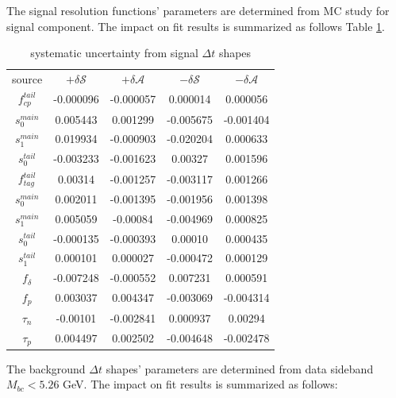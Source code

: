 The signal resolution functions' parameters are determined from MC study for signal component. The impact on fit results is summarized as follows Table \ref{tab:sy_res}.
\begin{table}[H]
	\begin{minipage}[b]{1.0\linewidth}
		\centering
		\caption{systematic uncertainty from signal $\Delta t$ shapes}
		\label{tab:sy_res}
		\begin{tabular}{c c c c c}
			\hline
			source & $+\delta \mathcal{S}$ & $+\delta \mathcal{A}$ & $-\delta \mathcal{S}$ &  $-\delta \mathcal{A}$\\
			$f_{cp}^{tail}$ & -0.000096 & -0.000057
			& 0.000014
			& 0.000056
			\\
			$s_0^{main}$& 0.005443
			& 0.001299
			& -0.005675
			& -0.001404
			\\
			$s_1^{main}$ & 0.019934
			& -0.000903
			& -0.020204
			& 0.000633
			\\
			$s_0^{tail}$ &  -0.003233
			& -0.001623
			& 0.00327
			& 0.001596
			\\
			$f_{tag}^{tail}$ & 0.00314
			& -0.001257
			& -0.003117
			& 0.001266
			\\
			$s_0^{main}$&  0.002011
			& -0.001395
			& -0.001956
			& 0.001398
			\\
			$s_1^{main}$ & 0.005059
			& -0.00084
			& -0.004969
			& 0.000825
			\\
			$s_0^{tail}$ &  -0.000135
			& -0.000393
			& 0.00010 & 0.000435
			\\
			$s_1^{tail}$  & 0.000101 & 0.000027 &  -0.000472
			& 0.000129
			\\
			$f_{\delta}$ & -0.007248
			& -0.000552
			& 0.007231
			& 0.000591
			\\
			$f_p$ &  0.003037
			& 0.004347
			& -0.003069
			& -0.004314
			\\
			$\tau_n$ & -0.00101 & -0.002841
			& 0.000937
			& 0.00294
			\\
			$\tau_p$ &  0.004497
			& 0.002502
			& -0.004648
			& -0.002478
			\\
			\hline
		\end{tabular}
	\end{minipage}
\end{table}
The background $\Delta t$ shapes' parameters are determined from data sideband $M_{bc}<5.26$ GeV. The impact on fit results is summarized as follows: 
